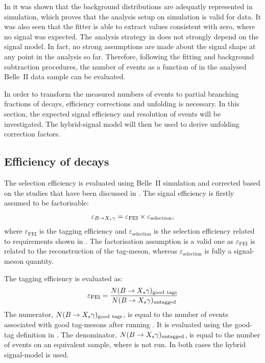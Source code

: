 In  it was shown that the background distributions are adequatly represented in simulation,
which proves that the analysis setup on simulation is valid for data.
It was also seen that the \Mbc fitter is able to extract values consistent with zero, where no \BtoXsgamma signal was expected.
The analysis strategy in  does not strongly depend on the signal model.
In fact, no strong assumptions are made about the signal shape at any point in the analysis so far.
Therefore, following the fitting and background subtraction procedures, the number of \BtoXsgamma events as a function of \EB in the analysed Belle~II data sample can be evaluated. 

In order to transform the measured numbers of \BtoXsgamma events to partial branching fractions of \BtoXsgamma decays, efficiency corrections and unfolding is necessary.
In this section, the expected signal efficiency and \EB resolution of \BtoXsgamma events will be investigated.
The hybrid-signal model will then be used to derive unfolding correction factors.

\subsection{Efficiency of \texorpdfstring{\BtoXsgamma}{B->Xs gamma} decays}\label{sec:signal_efficiency}

The \BtoXsgamma selection efficiency is evaluated using Belle~II simulation and corrected
based on the studies that have been discussed in .
The signal efficiency is firstly assumed to be factorisable:
\begin{equation}\label{eq:factorisable_signal_efficiency}
    \varepsilon_{\BtoXsgamma} = \varepsilon_{\mathrm{FEI}} \times \varepsilon_{\mathrm{selection}},
\end{equation}
where $\varepsilon_{\mathrm{FEI}}$ is the \FEI tagging efficiency and 
$\varepsilon_{\mathrm{selection}}$ is the selection efficiency related to requirements shown in .
The factorisation assumption is a valid one as $\varepsilon_{\mathrm{FEI}}$  is related to the reconstruction of the tag-\B meson,
whereas $\varepsilon_{\mathrm{selection}}$ is fully a signal-\B meson quantity.

The \FEI tagging efficiency is evaluated as:
\begin{equation}\label{eq:fei_tagging_efficiency}
    \varepsilon_{\mathrm{FEI}} = \frac{N(\BtoXsgamma)_{\mathrm{good~tags}}}{N(\BtoXsgamma)_{\mathrm{untagged}}}
\end{equation}
The numerator, $N(\BtoXsgamma)_{\mathrm{good~tags}}$, is equal to the number of \BtoXsgamma events associated with good tag-\B mesons after running \FEI. 
It is evaluated using the good-tag definition in .
The denominator, $N(\BtoXsgamma)_{\mathrm{untagged}}$, is equal to the number of \BtoXsgamma events on an equivalent sample, where \FEI is not run.
In both cases the hybrid signal-model is used.

